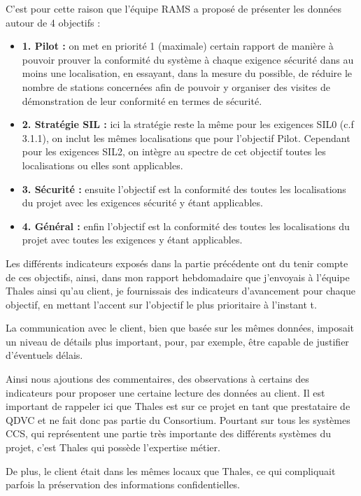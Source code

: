 C'est pour cette raison que l'équipe \gls{RAMS} a proposé de présenter les données autour de 4 objectifs :
\begin{itemize}
\item \textbf{1. Pilot :} on met en priorité 1 (maximale) certain rapport de manière à pouvoir prouver la conformité du système à chaque exigence sécurité dans au moins une localisation, en essayant, dans la mesure du possible, de réduire le nombre de stations concernées afin de pouvoir y organiser des visites de démonstration de leur conformité en termes de sécurité.
\item \textbf{2. Stratégie SIL :} ici la stratégie reste la même pour les exigences \gls{SIL}0 (c.f 3.1.1), on inclut les mêmes localisations que pour l'objectif Pilot. Cependant pour les exigences \gls{SIL}2, on intègre au spectre de cet objectif toutes les localisations ou elles sont applicables.
\item \textbf{3. Sécurité :} ensuite l'objectif est la conformité des toutes les localisations du projet avec les exigences sécurité y étant applicables.
\item \textbf{4. Général :} enfin l'objectif est la conformité des toutes les localisations du projet avec toutes les exigences y étant applicables.
\end{itemize}


Les différents indicateurs exposés dans la partie précédente ont du tenir compte de ces objectifs, ainsi, dans mon rapport hebdomadaire que j'envoyais à l'équipe Thales ainsi qu'au client, je fournissais des indicateurs d'avancement pour chaque objectif, en mettant l'accent sur l'objectif le plus prioritaire à l'instant t.


La communication avec le client, bien que basée sur les mêmes données, imposait un niveau de détails plus important, pour, par exemple, être capable de justifier d'éventuels délais.

Ainsi nous ajoutions des commentaires, des observations à certains des indicateurs pour proposer une certaine lecture des données au client.
Il est important de rappeler ici que Thales est sur ce projet en tant que prestataire de QDVC et ne fait donc pas partie du Consortium.
Pourtant sur tous les systèmes \gls{CCS}, qui représentent une partie très importante des différents systèmes du projet, c'est Thales qui possède l'expertise métier.

De plus, le client était dans les mêmes locaux que Thales, ce qui compliquait parfois la préservation des informations confidentielles.

